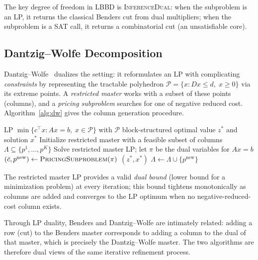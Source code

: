 \documentclass[11pt,a4paper]{article}
\begin{document}
The key degree of freedom in LBBD is \textsc{InferenceDual}: when the subproblem
is an LP, it returns the classical Benders cut from dual multipliers; when the
subproblem is a SAT call, it returns a combinatorial cut (an unsatisfiable core).

\subsection{Dantzig--Wolfe Decomposition}

Dantzig--Wolfe~\citep{dantzigwolfe1960} dualizes the setting: it reformulates
an LP with complicating \emph{constraints} by representing the tractable
polyhedron $\mathcal{P} = \{x : Dx \leq d,\; x \geq 0\}$ via its extreme
points. A \emph{restricted master} works with a subset of these points
(columns), and a \emph{pricing subproblem} searches for one of negative reduced
cost. Algorithm~\ref{alg:dw} gives the column generation procedure.

\begin{algorithm}[t]
\caption{Dantzig--Wolfe Decomposition (Column Generation)}
\label{alg:dw}
\begin{algorithmic}[1]
\Require LP $\min\{c^{\top}x : Ax = b,\; x \in \mathcal{P}\}$ with $\mathcal{P}$ block-structured
\Ensure optimal value $z^*$ and solution $x^*$
\State Initialize restricted master with a feasible subset of columns $\Lambda \subseteq \{p^1,\ldots,p^K\}$
\Loop
    \State Solve restricted master LP; let $\pi$ be the dual variables for $Ax = b$
    \State $(\bar{c}, p^{\mathrm{new}}) \leftarrow \textsc{PricingSubproblem}(\pi)$
        \State \Return $(z^*, x^*)$ 
    \EndIf
    \State $\Lambda \leftarrow \Lambda \cup \{p^{\mathrm{new}}\}$
\EndLoop
\end{algorithmic}
\end{algorithm}

The restricted master LP provides a valid \emph{dual bound} (lower bound for a
minimization problem) at every iteration; this bound tightens monotonically as
columns are added and converges to the LP optimum when no negative-reduced-cost
column exists.

Through LP duality, Benders and Dantzig--Wolfe are intimately related: adding a
row (cut) to the Benders master corresponds to adding a column to the dual of
that master, which is precisely the Dantzig--Wolfe master. The two algorithms
are therefore dual views of the same iterative refinement process.
\end{document}
